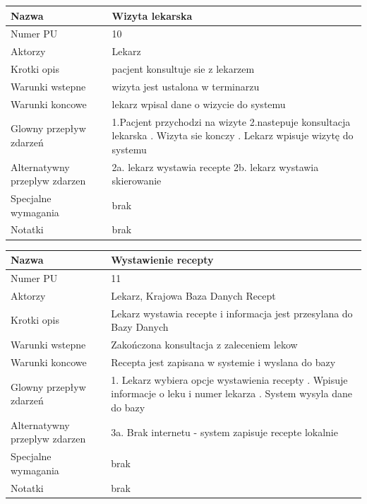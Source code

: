 \documentclass{article}
\begin{document}
\noindent
\begin{tabular}{|m{10em}|m{30em}|}
        \hline
        Nazwa &Wizyta lekarska \\
        \hline
        Numer PU & 10\\
        \hline
        Aktorzy & Lekarz\\
        \hline
        Krotki opis & pacjent konsultuje sie z lekarzem\\
        \hline
        Warunki wstepne & wizyta jest ustalona w terminarzu\\
        \hline
        Warunki koncowe & lekarz wpisal dane o wizycie do systemu\\
        \hline
        Glowny przepływ zdarzeń& 1.Pacjent przychodzi na wizyte \newline
                                 2.nastepuje konsultacja lekarska \newline
                                 3. Wizyta sie konczy \newline
                                 4. Lekarz wpisuje wizytę do systemu  \\
        \hline
        Alternatywny przeplyw zdarzen &  2a. lekarz wystawia recepte \newline
                                       2b. lekarz wystawia skierowanie\\
        \hline
        Specjalne wymagania & brak\\
        \hline
        Notatki& brak\\
        \hline
\end{tabular}

\vspace{1cm}

\noindent
\begin{tabular}{|m{10em}|m{30em}|}
        \hline
        Nazwa & Wystawienie recepty \\
        \hline
        Numer PU & 11\\
        \hline
        Aktorzy & Lekarz, Krajowa Baza Danych Recept\\
        \hline
        Krotki opis & Lekarz wystawia recepte i informacja jest przesylana do Bazy Danych\\
        \hline
        Warunki wstepne & Zakończona konsultacja z zaleceniem lekow\\
        \hline
        Warunki koncowe & Recepta jest zapisana w systemie i wyslana do bazy\\
        \hline
        Glowny przepływ zdarzeń & 1. Lekarz wybiera opcje wystawienia recepty \newline
                                 2. Wpisuje informacje o leku i numer lekarza \newline
                                 3. System wysyla dane do bazy  \\
        \hline
        Alternatywny przeplyw zdarzen &  3a. Brak internetu - system zapisuje recepte lokalnie\\
        \hline
        Specjalne wymagania & brak\\
        \hline
        Notatki& brak\\
        \hline
\end{tabular}
\end{document}
